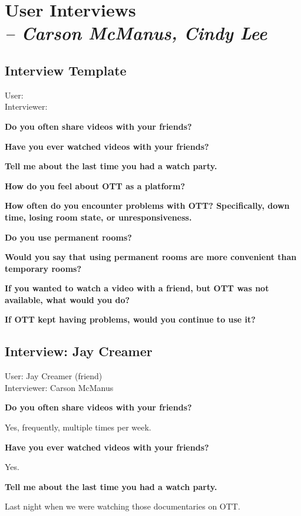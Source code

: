 \chapter{User Interviews \\
  \small{\textit{-- Carson McManus, Cindy Lee}}
  \label{Chapter::UserInterviews}}


\section{Interview Template}

User: \\
Interviewer:

\textbf{Do you often share videos with your friends?}

\textbf{Have you ever watched videos with your friends?}

\textbf{Tell me about the last time you had a watch party.}

\textbf{How do you feel about OTT as a platform?}

\textbf{How often do you encounter problems with OTT? Specifically, down time, losing room state, or unresponsiveness.}

\textbf{Do you use permanent rooms?}

\textbf{Would you say that using permanent rooms are more convenient than temporary rooms?}

\textbf{If you wanted to watch a video with a friend, but OTT was not available, what would you do?}

\textbf{If OTT kept having problems, would you continue to use it?}


\section{Interview: Jay Creamer}

User: Jay Creamer (friend) \\
Interviewer: Carson McManus

\textbf{Do you often share videos with your friends?}

Yes, frequently, multiple times per week.

\textbf{Have you ever watched videos with your friends?}

Yes.

\textbf{Tell me about the last time you had a watch party.}

Last night when we were watching those documentaries on OTT.

